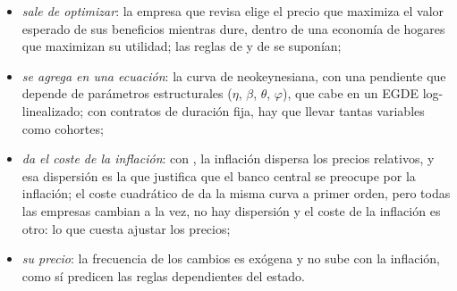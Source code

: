 \documentclass[11pt]{article}
\begin{document}
\begin{anotaciones}
\begin{itemize}
\begin{itemize}
  \item \emph{sale de optimizar}: la empresa que revisa elige el precio que maximiza el valor esperado de sus beneficios mientras dure, dentro de una economía de hogares que maximizan su utilidad; las reglas de  y de  se suponían;
  \item \emph{se agrega en una ecuación}: la curva de  neokeynesiana, con una pendiente que depende de parámetros estructurales ($\eta$, $\beta$, $\theta$, $\varphi$), que cabe en un EGDE log-linealizado; con contratos de duración fija, hay que llevar tantas variables como cohortes;
  \item \emph{da el coste de la inflación}: con , la inflación dispersa los precios relativos, y esa dispersión es la que justifica que el banco central se preocupe por la inflación; el coste cuadrático de \textcite{Rotemberg1982Monopolistic} da la misma curva a primer orden, pero todas las empresas cambian a la vez, no hay dispersión y el coste de la inflación es otro: lo que cuesta ajustar los precios;
  \item \emph{su precio}: la frecuencia de los cambios es exógena y no sube con la inflación, como sí predicen las reglas dependientes del estado.
  \end{itemize}
\end{itemize}
\begin{figuracaja}
\caption{Cómo se fijan los precios en cada modelo ante una subida permanente del dinero}\label{fig:reglas-precios}
\end{figuracaja}
\end{anotaciones}
\end{document}
